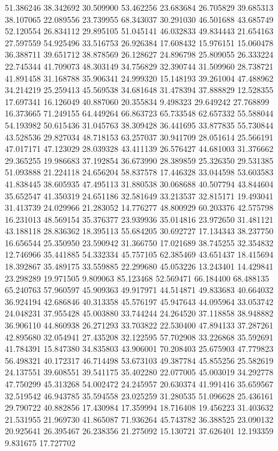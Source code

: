 51.386246
38.342692
30.509900
53.462256
23.683684
26.705829
39.685313
38.107065
22.089556
23.739955
68.343037
30.291030
46.501688
43.685749
52.120554
26.834112
29.895105
51.045141
46.032833
49.834443
21.654163
27.597559
54.925496
33.516753
26.926384
17.608432
15.976151
15.060478
36.388711
39.651712
38.878569
26.128627
24.896798
25.809055
26.333224
22.745344
41.709073
48.303149
34.756829
32.390744
31.509960
28.738721
41.891458
31.168788
35.906341
24.999320
15.148193
39.261004
47.488962
34.214219
25.259413
45.569538
34.681648
31.478394
37.888829
12.528355
17.697341
16.126049
40.887060
20.355834
9.498323
29.649242
27.768899
16.373665
71.249155
64.449264
66.863723
65.733548
62.657332
55.588044
54.193982
50.615436
31.045763
38.309428
36.441695
33.877835
55.730844
43.528536
29.827034
48.718153
63.257037
30.941709
28.051614
25.566191
47.017171
47.123029
28.039328
43.411139
26.576427
44.681003
31.376662
29.365255
19.986683
37.192854
36.673990
28.389859
25.326350
29.531385
51.093888
21.224118
24.656204
58.837578
17.446328
33.044598
53.603583
41.838445
38.605935
47.495113
31.880538
30.068688
40.507794
43.844604
35.652547
41.350319
24.651186
32.581649
33.213537
32.815171
19.493041
31.413739
24.029966
21.283052
14.776277
48.800929
60.203376
42.575798
16.231013
48.569154
35.376377
23.939936
35.014816
23.972650
31.481121
43.188118
28.836362
18.395113
55.684205
30.692727
17.134343
38.237750
16.656544
25.350950
23.590942
31.366750
17.021689
38.745255
32.354832
12.746966
35.441885
54.332334
45.757105
62.385469
43.651437
18.415694
18.392867
35.489175
33.559885
22.299680
45.053226
13.243401
14.429841
23.298289
19.971505
9.809063
85.123468
52.569471
66.184400
68.488135
65.240763
57.960597
45.909363
49.917971
44.514871
49.833683
40.664032
36.924194
42.686846
40.313358
45.576197
45.947643
44.095964
33.053742
24.048231
37.955428
45.003880
33.744244
24.264520
37.118858
38.948882
36.906110
44.860938
26.271293
33.703822
22.530400
47.894133
37.287261
42.895680
32.054941
27.435208
32.122595
57.702908
33.226868
35.592691
41.784391
15.847380
34.835803
43.906001
70.208403
25.675903
47.779823
56.498321
40.172317
46.714498
53.673103
49.387784
45.855256
25.582619
24.137551
39.608551
39.541175
35.402280
22.077005
45.003019
34.292778
47.750299
45.313268
54.002472
24.245957
20.630374
41.991416
35.659567
32.519542
46.943785
35.594558
23.025259
31.280535
51.096628
25.436161
29.790722
40.882856
17.430984
17.359994
18.716408
19.456223
31.403632
21.531955
21.969730
41.865087
71.936264
45.743782
36.388525
23.090132
20.925641
26.395467
26.238356
21.275092
15.130721
37.626401
12.193359
9.831675
17.727702
